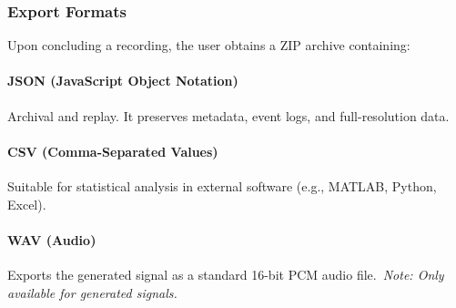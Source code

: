 \subsubsection{Export Formats}
Upon concluding a recording, the user obtains a ZIP archive containing:

\paragraph*{JSON (JavaScript Object Notation)}
Archival and replay. It preserves metadata, event logs, and full-resolution data.

\paragraph*{CSV (Comma-Separated Values)}
Suitable for statistical analysis in external software (e.g., MATLAB, Python, Excel).

\paragraph*{WAV (Audio)}
Exports the generated signal as a standard 16-bit PCM audio file.~\textit{Note: Only available for generated signals.}